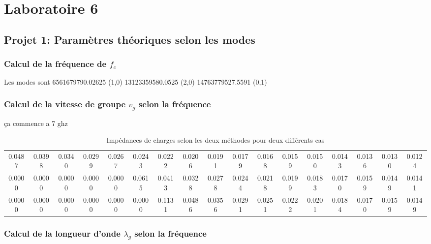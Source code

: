 



\label{s:experimentation}
\chapter{Laboratoire 6}
\section{Projet 1: Paramètres théoriques selon les modes}
\subsection{Calcul de la fréquence de $f_c$}
Les modes sont   
6561679790.02625 (1,0)
13123359580.0525 (2,0)
14763779527.5591 (0,1)

\subsection{Calcul de la vitesse de groupe $v_g$ selon la fréquence}

ça commence a 7 ghz
  \begin{table}[htbp]
    \centering
    \begin{tabular}{|c|c|c|c|c|c|c|c|c|c|c|c|c|c|c|c|c|} \hline
	0.0487 & 0.0398 & 0.0340 & 0.0299 & 0.0267 & 0.0243 & 0.0222 & 0.0206 & 0.0191 & 0.0179 & 0.0168 & 0.0159 & 0.0150 & 0.0143 & 0.0136 & 0.0130 & 0.0124\\ 
	0.0000 & 0.0000 & 0.0000 & 0.0000 & 0.0000 & 0.0615 & 0.0413 & 0.0328 & 0.0278 & 0.0244 & 0.0218 & 0.0199 & 0.0183 & 0.0170 & 0.0159 & 0.0149 & 0.0141\\ 
	0.0000 & 0.0000 & 0.0000 & 0.0000 & 0.0000 & 0.0000 & 0.1131 & 0.0486 & 0.0356 & 0.0291 & 0.0251 & 0.0222 & 0.0201 & 0.0184 & 0.0170 & 0.0159 & 0.0149 \\\hline
    
    \end{tabular}%
        \caption{Impédances de charges selon les deux méthodes pour deux différents cas}
    \label{tab:4}%
\end{table}%



\subsection{Calcul de la longueur d'onde $\lambda_g$ selon la fréquence}

